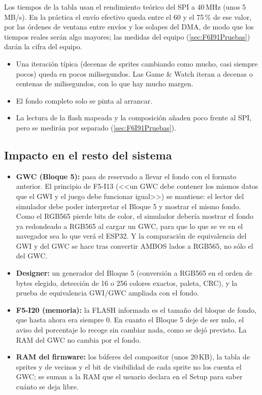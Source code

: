 Los tiempos de la tabla usan el rendimiento teórico del SPI a 40\,MHz (unos 5\,MB/s). En la práctica el envío efectivo queda entre el 60 y el 75\,\% de ese valor, por las órdenes de ventana entre envíos y los solapes del DMA, de modo que los tiempos reales serán algo mayores; las medidas del equipo (\ref{sec:F6I91Pruebas}) darán la cifra del equipo.

\begin{itemize}
	\item Una iteración típica (decenas de sprites cambiando como mucho, casi siempre pocos) queda en pocos milisegundos. Las Game \& Watch iteran a decenas o centenas de milisegundos, con lo que hay mucho margen.
	\item El fondo completo solo se pinta al arrancar.
	\item La lectura de la flash mapeada y la composición añaden poco frente al SPI, pero se medirán por separado (\ref{sec:F6I91Pruebas}).
\end{itemize}

\subsection{Impacto en el resto del sistema}
\label{sec:F6I91Impacto}

\begin{itemize}
	\item \textbf{GWC (Bloque 5):} pasa de reservado a llevar el fondo con el formato anterior. El principio de F5-I13 (<<un GWC debe contener los mismos datos que el GWI y el juego debe funcionar igual>>) se mantiene: el lector del simulador debe poder interpretar el Bloque 5 y mostrar el mismo fondo. Como el RGB565 pierde bits de color, el simulador debería mostrar el fondo ya redondeado a RGB565 al cargar un GWC, para que lo que se ve en el navegador sea lo que verá el ESP32. Y la comparación de equivalencia del GWI y del GWC se hace tras convertir AMBOS lados a RGB565, no sólo el del GWC.
	\item \textbf{Designer:} un generador del Bloque 5 (conversión a RGB565 en el orden de bytes elegido, detección de 16 o 256 colores exactos, paleta, CRC), y la prueba de equivalencia GWI/GWC ampliada con el fondo.
	\item \textbf{F5-I20 (memoria):} la FLASH informada es el tamaño del bloque de fondo, que hasta ahora era siempre 0. En cuanto el Bloque 5 deje de ser nulo, el aviso del porcentaje lo recoge sin cambiar nada, como se dejó previsto. La RAM del GWC no cambia por el fondo.
	\item \textbf{RAM del firmware:} los búferes del compositor (unos 20\,KB), la tabla de sprites y de vecinos y el bit de visibilidad de cada sprite no los cuenta el GWC; se suman a la RAM que el usuario declara en el Setup para saber cuánto se deja libre.
\end{itemize}


